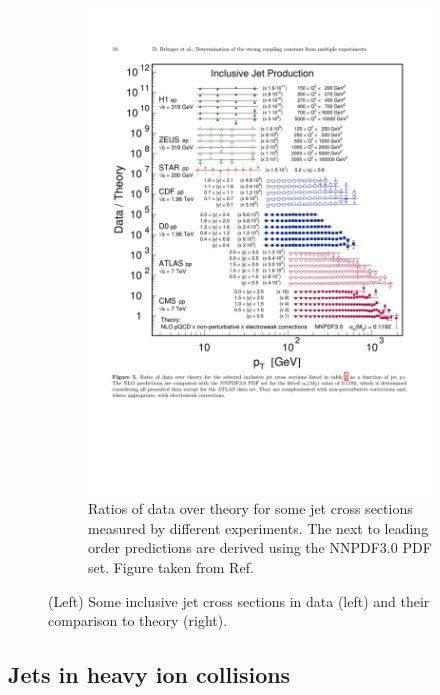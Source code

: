 \begin{figure}
\begin{subfigure}{.45\textwidth}
\end{subfigure}
\qquad  \qquad  
\begin{subfigure}{.45\textwidth}  
  \centering
  \includegraphics[width=\linewidth]{figures/theory/jetcs_pp_theory_comparison}
  \caption{Ratios of data over theory for some jet cross sections measured by different experiments.
  The next to leading order predictions are derived using the NNPDF3.0 PDF set.
  Figure taken from Ref.~\cite{Britzger:2017maj}}
  \label{fig:jetcs_pp_theory_comparison}
\end{subfigure}
\caption{(Left) Some inclusive jet cross sections in data (left) and their comparison to theory (right).}
\label{fig:jetcs}
\end{figure}




\subsection{Jets in heavy ion collisions}

